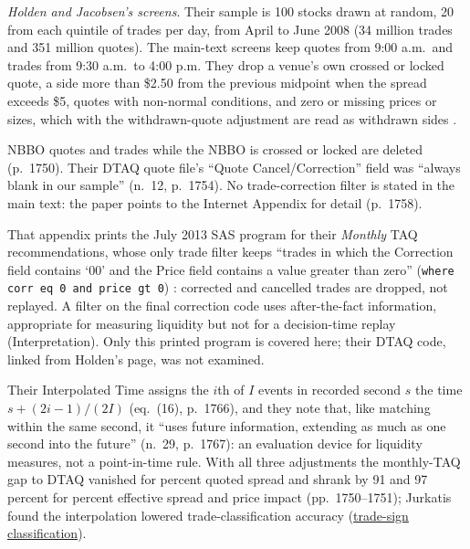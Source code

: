 \begin{qfdata}
\emph{Holden and Jacobsen's screens}. Their sample is 100 stocks drawn at random, 20 from each quintile of trades per day, from April to June 2008 (34 million trades and 351 million quotes). The main-text screens keep quotes from 9:00 a.m.\ and trades from 9:30 a.m.\ to 4:00 p.m. They drop a venue's own crossed or locked quote, a side more than \$2.50 from the previous midpoint when the spread exceeds \$5, quotes with non-normal conditions, and zero or missing prices or sizes, which with the withdrawn-quote adjustment are read as withdrawn sides \citep[published version, sec.~III, p.~1758 and n.~16]{wide-holden-jacobsen}.

NBBO quotes and trades while the NBBO is crossed or locked are deleted (p.~1750). Their DTAQ quote file's ``Quote Cancel/Correction'' field was ``always blank in our sample'' (n.~12, p.~1754). No trade-correction filter is stated in the main text: the paper points to the Internet Appendix for detail (p.~1758).

That appendix prints the July 2013 SAS program for their \emph{Monthly} TAQ recommendations, whose only trade filter keeps ``trades in which the Correction field contains `00' and the Price field contains a value greater than zero'' (\texttt{where corr eq 0 and price gt 0}) \citep[Internet Appendix, sec.~I and the program's step three, PDF pp.~1--2 and~19]{wide-holden-jacobsen}: corrected and cancelled trades are dropped, not replayed. A filter on the final correction code uses after-the-fact information, appropriate for measuring liquidity but not for a decision-time replay (Interpretation). Only this printed program is covered here; their DTAQ code, linked from Holden's page, was not examined.

Their Interpolated Time assigns the $i$th of $I$ events in recorded second $s$ the time $s+(2i-1)/(2I)$ (eq.~(16), p.~1766), and they note that, like matching within the same second, it ``uses future information, extending as much as one second into the future'' (n.~29, p.~1767): an evaluation device for liquidity measures, not a point-in-time rule. With all three adjustments the monthly-TAQ gap to DTAQ vanished for percent quoted spread and shrank by 91 and 97 percent for percent effective spread and price impact (pp.~1750--1751); Jurkatis found the interpolation lowered trade-classification accuracy (\hyperref[meth:trade-sign-classification]{trade-sign classification}).


\end{qfdata}
